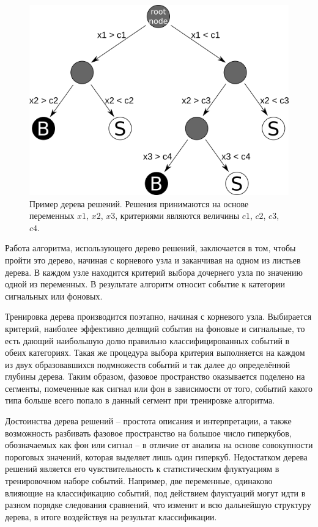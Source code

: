 \documentclass[14pt]{extarticle}
\begin{document}
\begin{figure}[h!]
	\centering
	\includegraphics[width=0.7\linewidth]{../pics/decision.png}
	\caption{Пример дерева решений. Решения принимаются на основе переменных $x1$, $x2$, $x3$, критериями являются величины $c1$, $c2$, $c3$, $c4$.}
	\label{fig:dectree}
\end{figure}

Работа алгоритма, использующего дерево решений, заключается в том, чтобы пройти это дерево, начиная с корневого узла и заканчивая на одном из листьев дерева. В каждом узле находится критерий выбора дочернего узла по значению одной из переменных. В результате алгоритм относит событие к категории сигнальных или фоновых.

Тренировка дерева производится поэтапно, начиная с корневого узла. Выбирается критерий, наиболее эффективно делящий события на фоновые и сигнальные, то есть дающий наибольшую долю правильно классифицированных событий в обеих категориях. Такая же процедура выбора критерия выполняется на каждом из двух образовавшихся подмножеств событий и так далее до определённой глубины дерева. Таким образом, фазовое пространство оказывается поделено на сегменты, помеченные как сигнал или фон в зависимости от того, событий какого типа больше всего попало в данный сегмент при тренировке алгоритма.

Достоинства дерева решений -- простота описания и интерпретации, а также возможность разбивать фазовое пространство на большое число гиперкубов, обозначаемых как фон или сигнал -- в отличие от анализа на основе совокупности пороговых значений, которая выделяет лишь один гиперкуб. Недостатком дерева решений является его чувствительность к статистическим флуктуациям в тренировочном наборе событий. Например, две переменные, одинаково влияющие на классификацию событий, под действием флуктуаций могут идти в разном порядке следования сравнений, что изменит и всю дальнейшую структуру дерева, в итоге воздействуя на результат классификации.
\end{document}
